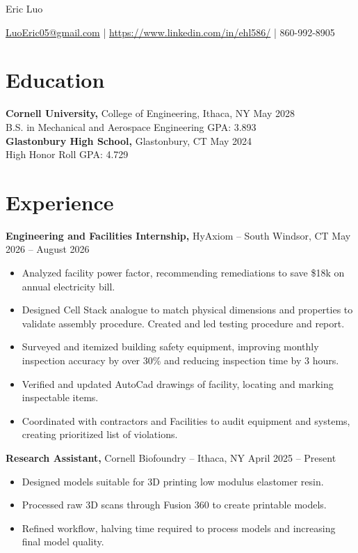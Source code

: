\documentclass[12pt]{article}       %
\begin{document}
\centerline{\Huge Eric Luo}

\vspace{4pt}

\centerline{\href{mailto:LuoEric05@gmail.com}{LuoEric05@gmail.com} |
      \href{www.linkedin.com/in/ehl586} {https://www.linkedin.com/in/ehl586/} | {860-992-8905}}

\vspace{-20pt}

\section*{Education}
\textbf{Cornell University,} College of Engineering, Ithaca, NY \hfill May 2028 \\
B.S. in Mechanical and Aerospace Engineering  \hfill GPA: 3.893 \\
\textbf{Glastonbury High School,} Glastonbury, CT \hfill May 2024 \\
High Honor Roll \hfill GPA: 4.729
\vspace{-12.5pt}

\section*{Experience}
\textbf{Engineering and Facilities Internship,} {HyAxiom} -- South Windsor, CT \hfill May 2026 -- August 2026
\\
\vspace{-9pt}
\begin{itemize}
      \item Analyzed facility power factor, recommending remediations to save \$18k on
            annual electricity bill.
      \item Designed Cell Stack analogue to match physical dimensions and properties to
            validate assembly procedure. Created and led testing procedure and report.
      \item Surveyed and itemized building safety equipment, improving monthly inspection
            accuracy by over 30\% and reducing inspection time by 3 hours.
      \item Verified and updated AutoCad drawings of facility, locating and marking
            inspectable items.
      \item Coordinated with contractors and Facilities to audit equipment and systems,
            creating prioritized list of violations.
\end{itemize}
\textbf{Research Assistant,} {Cornell Biofoundry} -- Ithaca, NY \hfill April 2025 -- Present
\\
\vspace{-9pt}
\begin{itemize}
      \item Designed models suitable for 3D printing low modulus elastomer resin. 
      \item Processed raw 3D scans through Fusion 360 to create printable models.
      \item Refined workflow, halving time required to process models and increasing final
            model quality.
\end{itemize}
\end{document}
